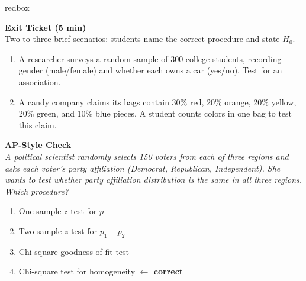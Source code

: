 \documentclass[10pt]{article}
\begin{document}
\begin{skillbox}{redbox}
\begin{minipage}[t]{0.48\linewidth}
    \textbf{Exit Ticket (5 min)}\\
    Two to three brief scenarios: students name the correct procedure and state $H_0$.
    \begin{enumerate}
        \item A researcher surveys a random sample of 300 college students, recording gender
              (male/female) and whether each owns a car (yes/no). Test for an association.
        \item A candy company claims its bags contain 30\% red, 20\% orange, 20\% yellow,
              20\% green, and 10\% blue pieces. A student counts colors in one bag to test
              this claim.
    \end{enumerate}
\end{minipage}
\hfill
\begin{minipage}[t]{0.48\linewidth}
    \textbf{AP-Style Check}\\
    \textit{A political scientist randomly selects 150 voters from each of three regions and asks
    each voter's party affiliation (Democrat, Republican, Independent). She wants to test
    whether party affiliation distribution is the same in all three regions. Which procedure?}
    \begin{enumerate}[label=(\Alph*)]
        \item One-sample $z$-test for $p$
        \item Two-sample $z$-test for $p_1-p_2$
        \item Chi-square goodness-of-fit test
        \item Chi-square test for homogeneity \textcolor{keyred}{\textbf{$\leftarrow$ correct}}
    \end{enumerate}
\end{minipage}
\end{skillbox}
\end{document}
